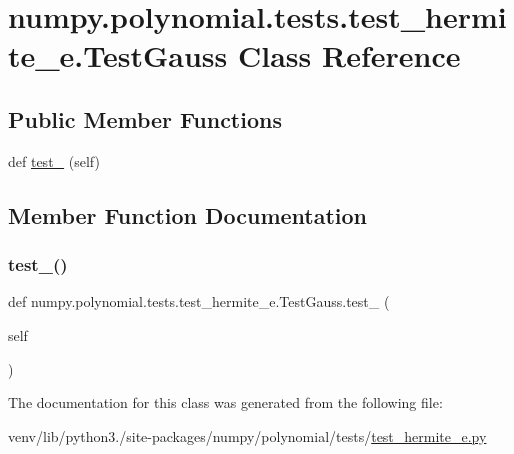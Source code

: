 \hypertarget{classnumpy_1_1polynomial_1_1tests_1_1test__hermite__e_1_1TestGauss}{}\section{numpy.\+polynomial.\+tests.\+test\+\_\+hermite\+\_\+e.\+Test\+Gauss Class Reference}
\label{classnumpy_1_1polynomial_1_1tests_1_1test__hermite__e_1_1TestGauss}
\subsection*{Public Member Functions}
\begin{DoxyCompactItemize}
\item 
def \hyperlink{classnumpy_1_1polynomial_1_1tests_1_1test__hermite__e_1_1TestGauss_a826fc29370d77fa87551be43d9b0c3dd}{test\+\_} (self)
\end{DoxyCompactItemize}


\subsection{Member Function Documentation}
\mbox{\label{classnumpy_1_1polynomial_1_1tests_1_1test__hermite__e_1_1TestGauss_a826fc29370d77fa87551be43d9b0c3dd}} 
\subsubsection{\texorpdfstring{test\+\_()}{test\_100()}}
{\footnotesize\ttfamily def numpy.\+polynomial.\+tests.\+test\+\_\+hermite\+\_\+e.\+Test\+Gauss.\+test\+\_ (\begin{DoxyParamCaption}\item[{}]{self }\end{DoxyParamCaption})}



The documentation for this class was generated from the following file\+:\begin{DoxyCompactItemize}
\item 
venv/lib/python3./site-\/packages/numpy/polynomial/tests/\hyperlink{test__hermite__e_8py}{test\+\_\+hermite\+\_\+e.\+py}\end{DoxyCompactItemize}
